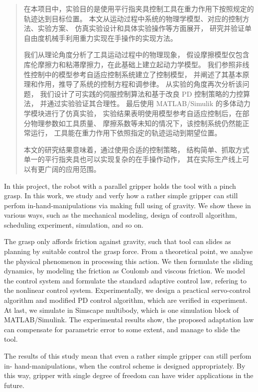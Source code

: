 
\begin{abstract}
在本项目中，实验目的是使用平行指夹具控制工具在重力作用下按照规定的轨迹达到目标位置。
本文从运动过程中系统的物理学模型、对应的控制方法、实验方案、
仿真实验设计和具体实验操作等方面展开，
研究并验证单自由度机械手利用重力实现在手操作的实现方法。

我们从理论角度分析了工具运动过程中的物理现象，
假设摩擦模型仅包含库伦摩擦力和粘滞摩擦力，在此基础上建立起动力学模型。
我们参照非线性控制中的模型参考自适应控制系统建立了控制模型，
并阐述了其基本原理和作用，推导了系统的控制方程和调参律。
从实验的角度再次分析该问题，
我们设计了可实践的伺服控制算法和基于改良 PD 控制策略的力控算法，
并通过实验验证其合理性。
最后使用 MATLAB/Simulik 的多体动力学模块进行了仿真实验，
实验结果表明使用模型参考自适应控制后，在部分物理参数如工具质量、
摩擦系数等未知的情况下，该控制系统仍然能正常运行，
工具能在重力作用下依照指定的轨迹运动到期望位置。

本文的研究结果意味着，通过使用合适的控制策略，
结构简单、抓取方式单一的平行指夹具也可以实现复杂的在手操作动作，
其在实际生产线上可以有更广阔的应用范围。

\end{abstract}

\begin{enabstract}
In this project, the robot with a parallel gripper holds the tool with a pinch grasp.
In this work, we study and verfy how a rather simple gripper can still perfom in-hand-manipulations via making full using of gravity.
We show these in various ways, such as the mechanical modeling,
design of controll algorithm, scheduling experiment, simulation, and so on.

The grasp only affords friction against gravity,
such that tool can slides as planning by suitable control the grasp force.
From a theoretical point, we analyse the physical phenomenon in processing this action.
We then formulate the sliding dynamics,
by modeling the friction as Coulomb and viscous friction.
We model the control system and formulate the standard adaptive control law,
refering to the nonlinear control system.
Experimentally, we design a practical servo-control algorithm and
modified PD control algorithm, which are verified in experiment.
At last, we simulate in Simscape multibody,
which is one simulation block of MATLAB/Simulink.
The experimental results show, the proposed adaptation law can
compensate for parametric error to some extent, and manage to slide the tool.

The results of this study mean that even a rather simple gripper can still perfom in- hand-manipulations,
when the control scheme is designed appropriately.
By this way, gripper with single degree of freedom can have wider applications in the future.

\end{enabstract}

